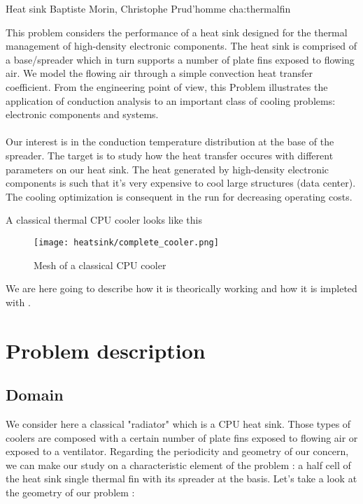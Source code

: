             {Heat sink}
            {Baptiste Morin, Christophe Prud'homme}
            {cha:thermalfin}

This problem considers the performance of a heat sink designed for the thermal management of high-density electronic components. The heat sink is comprised of a base/spreader which in turn supports a number of plate fins exposed to flowing air. We model the flowing air through a simple convection heat transfer coefficient. From the engineering point of view, this Problem illustrates the application of conduction analysis to an important class of cooling problems: electronic components and systems. \\ \\
Our interest is in the conduction temperature distribution at the base of the spreader. The target is to study how the heat transfer occures with different parameters on our heat sink. The heat generated by high-density electronic components is such that it's very expensive to cool large structures (data center). The cooling optimization is consequent in the run for decreasing operating costs.

\noindent A classical thermal CPU cooler looks like this 

\begin{figure}[!h]
\centering
\texttt{[image: heatsink/complete\_cooler.png]}
\caption{Mesh of a classical CPU cooler}
\end{figure}

\noindent We are here going to describe how it is theorically working and how it is impleted with \feel. 

\section{Problem description}
\subsection{Domain}

We consider here a classical "radiator" which is a CPU heat sink. Those types of coolers are composed with a certain number of plate fins exposed to flowing air or exposed to a ventilator. Regarding the periodicity and geometry of our concern, we can make our study on a characteristic element of the problem : a half cell of the heat sink single thermal fin with its spreader at the basis. Let's take a look at the geometry of our problem :

